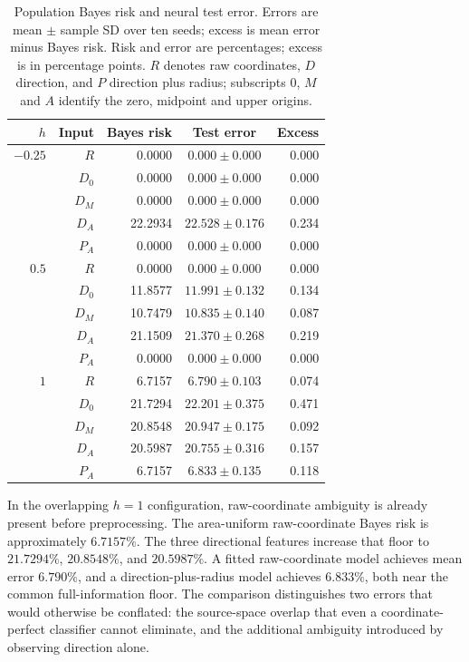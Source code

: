 \documentclass[12pt,a4paper]{article}
\begin{document}
\begin{table}[H]
\centering\small
\setlength{\tabcolsep}{3pt}
\caption{Population Bayes risk and neural test error. Errors are mean $\pm$ sample SD over ten seeds; excess is mean error minus Bayes risk. Risk and error are percentages; excess is in percentage points. $R$ denotes raw coordinates, $D$ direction, and $P$ direction plus radius; subscripts $0$, $M$ and $A$ identify the zero, midpoint and upper origins.}
\label{tab:neural-main}
\begin{tabular}{rrrcr}
\toprule
$h$ & Input & Bayes risk & Test error & Excess \\
\midrule
$-0.25$ & $R$   & 0.0000 & $0.000\pm0.000$ & 0.000 \\
         & $D_0$ & 0.0000 & $0.000\pm0.000$ & 0.000 \\
         & $D_M$ & 0.0000 & $0.000\pm0.000$ & 0.000 \\
         & $D_A$ & 22.2934 & $22.528\pm0.176$ & 0.234 \\
         & $P_A$ & 0.0000 & $0.000\pm0.000$ & 0.000 \\
\addlinespace
$0.5$    & $R$   & 0.0000 & $0.000\pm0.000$ & 0.000 \\
         & $D_0$ & 11.8577 & $11.991\pm0.132$ & 0.134 \\
         & $D_M$ & 10.7479 & $10.835\pm0.140$ & 0.087 \\
         & $D_A$ & 21.1509 & $21.370\pm0.268$ & 0.219 \\
         & $P_A$ & 0.0000 & $0.000\pm0.000$ & 0.000 \\
\addlinespace
$1$      & $R$   & 6.7157 & $6.790\pm0.103$ & 0.074 \\
         & $D_0$ & 21.7294 & $22.201\pm0.375$ & 0.471 \\
         & $D_M$ & 20.8548 & $20.947\pm0.175$ & 0.092 \\
         & $D_A$ & 20.5987 & $20.755\pm0.316$ & 0.157 \\
         & $P_A$ & 6.7157 & $6.833\pm0.135$ & 0.118 \\
\bottomrule
\end{tabular}
\end{table}

In the overlapping \(h=1\) configuration, raw-coordinate ambiguity is already present before preprocessing. The area-uniform raw-coordinate Bayes risk is approximately \(6.7157\%\). The three directional features increase that floor to \(21.7294\%\), \(20.8548\%\), and \(20.5987\%\). A fitted raw-coordinate model achieves mean error \(6.790\%\), and a direction-plus-radius model achieves \(6.833\%\), both near the common full-information floor. The comparison distinguishes two errors that would otherwise be conflated: the source-space overlap that even a coordinate-perfect classifier cannot eliminate, and the additional ambiguity introduced by observing direction alone.
\end{document}
